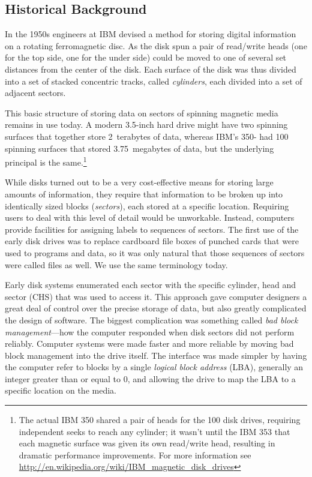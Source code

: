 \subsection{Historical Background}
In the 1950s engineers at IBM devised a method for storing digital
information on a rotating ferromagnetic disc. As the disk spun a pair
of read/write heads (one for the top side, one for the under side)
could be moved to one of several set distances from the center of the
disk. Each surface of the disk was thus divided into a set of stacked
concentric tracks, called \emph{cylinders}, each divided into a set of
adjacent sectors.


This basic structure of storing data on sectors of spinning magnetic
media remains in use today. A modern 3.5-inch hard drive might have two
spinning surfaces that together store 2~terabytes of data, whereas
IBM's 350- had 100 spinning surfaces that stored 3.75~megabytes of
data, but the underlying principal is the same.\footnote{The actual IBM 350
  shared a pair of heads for the 100 disk drives, requiring
  independent seeks to reach any cylinder; it wasn't until the IBM 353
  that each magnetic surface was given its own read/write head,
  resulting in dramatic performance improvements. For more information
  see \url{http://en.wikipedia.org/wiki/IBM_magnetic_disk_drives}}

While disks turned out to be a very cost-effective means for storing large
amounts of information, they require that information to be broken up
into identically sized blocks (\emph{sectors}), each stored at a
specific location. Requiring users to deal with this level of detail
would be unworkable. Instead, computers provide facilities for
assigning labels to sequences of sectors. The first use of the early
disk drives was to replace cardboard file boxes of punched cards that
were used to programs and data, so it was only natural that those
sequences of sectors were called files as well. We use the same
terminology today.

Early disk systems enumerated each sector with the specific cylinder,
head and sector (CHS) that was used to access it. This approach gave
computer designers a great deal of control over the precise storage of
data, but also greatly complicated the design of software. The biggest
complication was something called \emph{bad block management}---how
the computer responded when disk sectors did not perform reliably.
Computer systems were made faster and more reliable by moving bad
block management into the drive itself. The interface was made
simpler by having the computer refer to blocks by a single
\emph{logical block address} (LBA), generally an integer greater than
or equal to 0, and allowing the drive to map the LBA to a specific
location on the media. 

